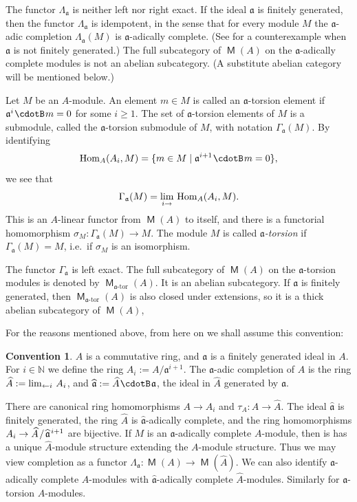 \documentclass[10pt]{amsart}
\theoremstyle{definition}
\newtheorem{conv}[equation]{Convention}
\numberwithin{equation}{section}
\newcommand{\lto}{\leftarrow}
\newcommand{\opn}{\operatorname}
\newcommand{\cat}[1]{\operatorname{\mathsf{#1}}}
\newcommand{\cd}{\mspace{1.3mu}{\cdotB}\mspace{1.3mu}}
\newcommand{\mfrak}[1]{\mathfrak{#1}}
\newcommand{\Ga}{\Gamma}
\newcommand{\si}{\sigma}
\newcommand{\La}{\Lambda}
\renewcommand{\a}{\mfrak{a}}
\newcommand{\N}{\mathbb{N}}
\newcommand{\what}[1]{\widehat{#1}}
\newcommand{\msp}[1]{\mspace{#1 mu}}
\begin{document}
The functor $\La_{\a}$ is neither left nor right exact.
If the ideal $\a$ is finitely generated, then the functor $\La_{\a}$
is idempotent, in the sense that for every module $M$ the $\a$-adic completion
$\La_{\a}(M)$ is $\a$-adically complete.
(See \cite[Example 1.8]{Ye1} for a counterexample when $\a$ is not finitely
generated.)
The full subcategory of $\cat{M}(A)$ on the $\a$-adically complete modules
is not an abelian subcategory.
(A substitute abelian category will be mentioned below.)

Let $M$ be an $A$-module. An element $m \in M$ is called an $\a$-torsion
element if $\a^i \cd m = 0$ for some $i \geq 1$. The set of
$\a$-torsion elements of $M$ is a submodule, called the $\a$-torsion submodule
of $M$, with notation $\Ga_{\a}(M)$.
By identifying
\[ \opn{Hom}_{A}({A_i}, M) = \{ m \in M \mid \a^{i + 1} \cd m = 0 \} , \]
we see that
\begin{equation} \label{eqn:256}
\Ga_{\a}(M) = \lim_{i \to} \msp{3} \opn{Hom}_{A}({A_i}, M) .
\end{equation}
This is an $A$-linear functor from $\cat{M}(A)$ to itself, and there is
a functorial homomorphism $\si_M : \Ga_{\a}(M) \to M$.
The module $M$ is called {\em $\a$-torsion} if $\Ga_{\a}(M) = M$, i.e.\ if
$\si_M$ is an isomorphism.

The functor $\Ga_{\a}$ is left exact. The full subcategory of
$\cat{M}(A)$ on the $\a$-torsion modules is denoted by
$\cat{M}_{\text{$\a$-tor}}(A)$.
It is an abelian subcategory. If $\a$ is finitely generated, then
$\cat{M}_{\text{$\a$-tor}}(A)$ is also closed under extensions, so it is a
thick abelian subcategory of $\cat{M}(A)$,

For the reasons mentioned above, from here on we shall assume this convention:

\begin{conv} \label{conv:280}
$A$ is a commutative ring, and $\a$ is a finitely generated ideal in
$A$. For $i \in \N$ we define the ring $A_i := A / \a^{i + 1}$. The $\a$-adic
completion of $A$ is the ring
$\what{A} := \lim_{\lto i} \msp{3} A_i$,
and $\what{\a} := \what{A} \cd \a$, the ideal in $\what{A}$ generated by $\a$.
\end{conv}

There are canonical ring homomorphisms $A \to A_i$ and
$\tau_A  : A \to \what{A}$. The ideal $\what{\a}$ is
finitely generated, the ring $\what{A}$ is $\what{\a}$-adically complete,
and the ring homomorphisms
$A_i \to \what{A} \msp{2} / \msp{2} \what{\a}^{\msp{2} i + 1}$ are
bijective.
If $M$ is an $\a$-adically complete $A$-module, then is has a unique
$\what{A}$-module structure extending the $A$-module structure.
Thus we may view completion as a functor
$\La_{\a} : \cat{M}(A) \to \cat{M}(\what{A})$.
We can also identify $\a$-adically complete $A$-modules with
$\what{\a}$-adically complete $\what{A}$-modules.
Similarly for $\a$-torsion $A$-modules.
\end{document}
